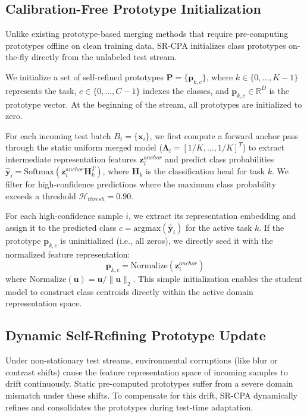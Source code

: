 \documentclass{article}
\theoremstyle{plain}
\theoremstyle{definition}
\theoremstyle{remark}
\begin{document}
\subsection{Calibration-Free Prototype Initialization}
\label{subsec:init}

Unlike existing prototype-based merging methods that require pre-computing prototypes offline on clean training data, SR-CPA initializes class prototypes on-the-fly directly from the unlabeled test stream. 

We initialize a set of self-refined prototypes $\boldsymbol{P} = \{\boldsymbol{p}_{k,c}\}$, where $k \in \{0, \ldots, K-1\}$ represents the task, $c \in \{0, \ldots, C-1\}$ indexes the classes, and $\boldsymbol{p}_{k,c} \in \mathbb{R}^D$ is the prototype vector. At the beginning of the stream, all prototypes are initialized to zero.

For each incoming test batch $B_t = \{\boldsymbol{x}_i\}$, we first compute a forward anchor pass through the static uniform merged model ($\boldsymbol{\Lambda}_l = [1/K, \ldots, 1/K]^T$) to extract intermediate representation features $\boldsymbol{z}_i^{anchor}$ and predict class probabilities $\boldsymbol{\hat{y}}_i = \text{Softmax}(\boldsymbol{z}_i^{anchor} \boldsymbol{H}_k^T)$, where $\boldsymbol{H}_k$ is the classification head for task $k$. We filter for high-confidence predictions where the maximum class probability exceeds a threshold $\mathcal{H}_{thresh} = 0.90$.

For each high-confidence sample $i$, we extract its representation embedding and assign it to the predicted class $c = \text{argmax}(\boldsymbol{\hat{y}}_i)$ for the active task $k$. If the prototype $\boldsymbol{p}_{k,c}$ is uninitialized (i.e., all zeros), we directly seed it with the normalized feature representation:
\begin{equation}
    \boldsymbol{p}_{k,c} = \text{Normalize}\left(\boldsymbol{z}_i^{anchor}\right)
\end{equation}
where $\text{Normalize}(\boldsymbol{u}) = \boldsymbol{u} / \|\boldsymbol{u}\|_2$. This simple initialization enables the student model to construct class centroids directly within the active domain representation space.

\subsection{Dynamic Self-Refining Prototype Update}
\label{subsec:refine}

Under non-stationary test streams, environmental corruptions (like blur or contrast shifts) cause the feature representation space of incoming samples to drift continuously. Static pre-computed prototypes suffer from a severe domain mismatch under these shifts. To compensate for this drift, SR-CPA dynamically refines and consolidates the prototypes during test-time adaptation.
\end{document}
